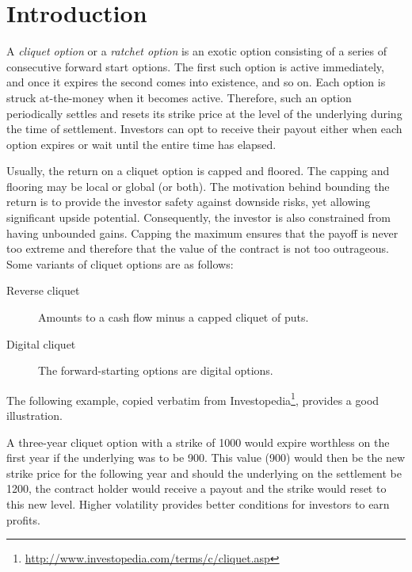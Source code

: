 

\section{Introduction}
\label{sec:clq-intro}

A \emph{cliquet option} or a \emph{ratchet option} is an exotic option consisting of a series of consecutive forward start options. The first such option is active immediately, and once it expires the second comes into existence, and so on. Each option is struck at-the-money when it becomes active. Therefore, such an option periodically settles and resets its strike price at the level of the underlying during the time of settlement. Investors can opt to receive their payout either when each option expires or wait until the entire time has elapsed.

Usually, the return on a cliquet option is capped and floored. The capping and flooring may be local or global (or both). The motivation behind bounding the return is to provide the investor safety against downside risks, yet allowing significant upside potential. Consequently, the investor is also constrained from having unbounded gains. Capping the maximum ensures that the payoff is never too extreme and therefore that the value of the contract is not too outrageous. Some variants of cliquet options are as follows:
\begin{description}
	\item[Reverse cliquet] Amounts to a cash flow minus a capped cliquet of puts.
	\item[Digital cliquet] The forward-starting options are digital options.
\end{description}

The following example, copied verbatim from Investopedia\footnote{\url{http://www.investopedia.com/terms/c/cliquet.asp}}, provides a good illustration.
\begin{eg}
	A three-year cliquet option with a strike of 1000 would expire worthless on the first year if the underlying was to be 900. This value (900) would then be the new strike price for the following year and should the underlying on the settlement be 1200, the contract holder would receive a payout and the strike would reset to this new level. Higher volatility provides better conditions for investors to earn profits.
\end{eg}



